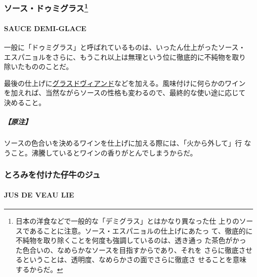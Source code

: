 \begin{recette}
{\subsubsection[ソース・ドゥミグラス]{\texorpdfstring{ソース・ドゥミグラス\footnote{日本の洋食などで一般的な「デミグラス」とはかなり異なった仕
  上りのソースであることに注意。ソース・エスパニョルの仕上げにあたっ
  て、徹底的に不純物を取り除くことを何度も強調しているのは、透き通っ
  た茶色がかった色合いの、なめらかなソースを目指すからであり、それを
  さらに徹底させるということは、透明度、なめらかさの面でさらに徹底さ
  せることを意味するからだ。}}{ソース・ドゥミグラス}}\label{ux30bdux30fcux30b9ux30c9ux30a5ux30dfux30b0ux30e9ux30b9102009}}

\hypertarget{sauce-demi-glace}{%
\paragraph{SAUCE DEMI-GLACE}\label{sauce-demi-glace}}


一般に「ドゥミグラス」と呼ばれているものは、いったん仕上がったソース・
エスパニョルをさらに、もうこれ以上は無理という位に徹底的に不純物を取り
除いたもののことだ。

最後の仕上げに\protect\hyperlink{glace-de-viande}{グラスドヴィアンド}などを加える。風味付けに何らかのワイン
を加えれば、当然ながらソースの性格も変わるので、最終的な使い途に応じて
決めること。

\hypertarget{ux539fux6ce8-1}{%
\subparagraph{【原注】}\label{ux539fux6ce8-1}}

ソースの色合いを決めるワインを仕上げに加える際には、「火から外して」行
なうこと。沸騰しているとワインの香りがとんでしまうからだ。

\maeaki

\hypertarget{ux3068ux308dux307fux3092ux4ed8ux3051ux305fux4ed4ux725bux306eux30b8ux30e5}{%
\subsubsection{とろみを付けた仔牛のジュ}\label{ux3068ux308dux307fux3092ux4ed8ux3051ux305fux4ed4ux725bux306eux30b8ux30e5}}

\hypertarget{jus-de-veau-lie}{%
\paragraph{JUS DE VEAU LIE}\label{jus-de-veau-lie}}


\end{recette}
